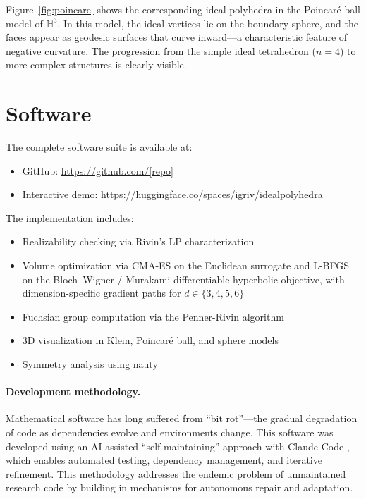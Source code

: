 \documentclass[11pt]{article}
\begin{document}
Figure~\ref{fig:poincare} shows the corresponding ideal polyhedra in the Poincar\'e ball model of $\mathbb{H}^3$. In this model, the ideal vertices lie on the boundary sphere, and the faces appear as geodesic surfaces that curve inward---a characteristic feature of negative curvature. The progression from the simple ideal tetrahedron ($n=4$) to more complex structures is clearly visible.

\section{Software}

The complete software suite is available at:
\begin{itemize}
    \item GitHub: \url{https://github.com/[repo]}
    \item Interactive demo: \url{https://huggingface.co/spaces/igriv/idealpolyhedra}
\end{itemize}

The implementation includes:
\begin{itemize}
    \item Realizability checking via Rivin's LP characterization
    \item Volume optimization via CMA-ES on the Euclidean surrogate
          and L-BFGS on the Bloch--Wigner / Murakami differentiable
          hyperbolic objective, with dimension-specific gradient paths
          for $d \in \{3,4,5,6\}$
    \item Fuchsian group computation via the Penner-Rivin algorithm
    \item 3D visualization in Klein, Poincaré ball, and sphere models
    \item Symmetry analysis using nauty
\end{itemize}

\paragraph{Development methodology.} Mathematical software has long suffered from ``bit rot''---the gradual degradation of code as dependencies evolve and environments change. This software was developed using an AI-assisted ``self-maintaining'' approach with Claude Code \cite{RivinDjinn}, which enables automated testing, dependency management, and iterative refinement. This methodology addresses the endemic problem of unmaintained research code by building in mechanisms for autonomous repair and adaptation.
\end{document}
